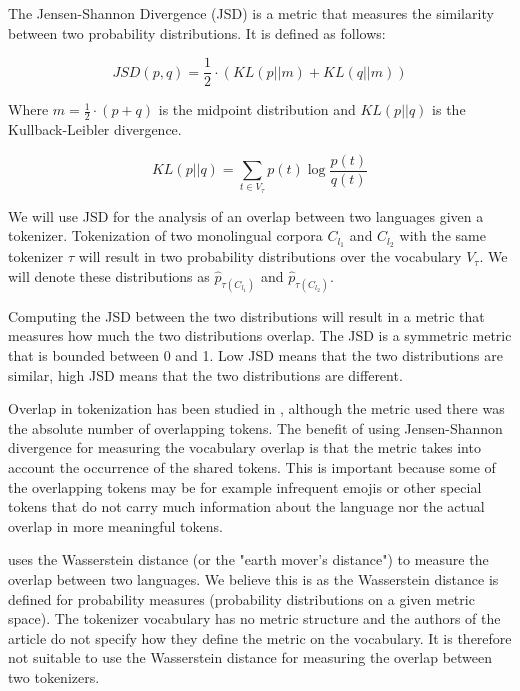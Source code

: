 The Jensen-Shannon Divergence (JSD) is a metric that measures the similarity between two probability distributions. It is defined as follows:

\begin{equation}
    JSD(p, q) = \frac{1}{2} \cdot (KL(p||m) + KL(q||m))
\end{equation}

Where $m = \frac{1}{2} \cdot (p + q)$ is the midpoint distribution and $KL(p||q)$ is the Kullback-Leibler divergence. 

\begin{equation}
    KL(p||q) = \sum_{t \in V_\tau} p(t) \log \frac{p(t)}{q(t)}
\end{equation}

We will use JSD for the analysis of an overlap between two languages given a tokenizer. Tokenization of two monolingual corpora $C_{l_1}$ and $C_{l_2}$ with the same tokenizer $\tau$ will result in two probability distributions over the vocabulary $V_\tau$. We will denote these distributions as $\hat{p}_{\tau(C_{l_1})}$ and $\hat{p}_{\tau(C_{l_2})}$. 

Computing the JSD between the two distributions will result in a metric that measures how much the two distributions overlap. The JSD is a symmetric metric that is bounded between 0 and 1. Low JSD means that the two distributions are similar, high JSD means that the two distributions are different. 

Overlap in tokenization has been studied in \citet{wu_beto_2019}, although the metric used there was the absolute number of overlapping tokens. The benefit of using Jensen-Shannon divergence for measuring the vocabulary overlap is that the metric takes into account the occurrence of the shared tokens. This is important because some of the overlapping tokens may be for example infrequent emojis or other special tokens that do not carry much information about the language nor the actual overlap in more meaningful tokens.

\citet{chung_improving_2020} uses the Wasserstein distance (or the "earth mover's distance") to measure the overlap between two languages. We believe this is  as the Wasserstein distance is defined for probability measures (probability distributions on a given metric space). The tokenizer vocabulary has no metric structure and the authors of the article do not specify how they define the metric on the vocabulary. It is therefore not suitable to use the Wasserstein distance for measuring the overlap between two tokenizers.

